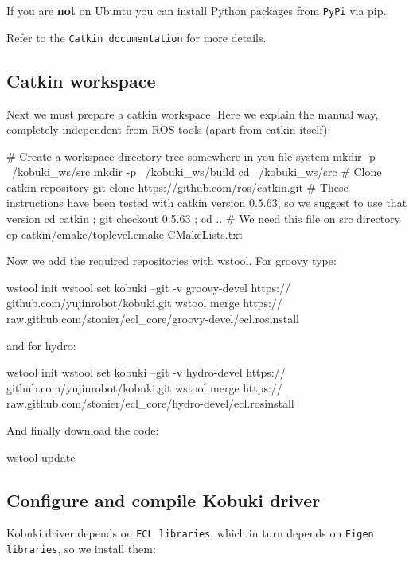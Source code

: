 \-If you are {\bfseries not} on \-Ubuntu you can install \-Python packages from {\tt \-Py\-Pi} via pip.

\-Refer to the {\tt \-Catkin documentation} for more details.\subsection{\-Catkin workspace}\label{enInstallationLinuxGuide_catkin}
\-Next we must prepare a catkin workspace. \-Here we explain the manual way, completely independent from \-R\-O\-S tools (apart from catkin itself)\-:


\begin{DoxyCode}
  # Create a workspace directory tree somewhere in you file system
  mkdir -p ~/kobuki_ws/src
  mkdir -p ~/kobuki_ws/build
  cd ~/kobuki_ws/src
  # Clone catkin repository
  git clone https://github.com/ros/catkin.git
  # These instructions have been tested with catkin version 0.5.63, so we
       suggest to use that version
  cd catkin ; git checkout 0.5.63 ; cd ..
  # We need this file on src directory
  cp catkin/cmake/toplevel.cmake CMakeLists.txt
\end{DoxyCode}


\-Now we add the required repositories with wstool. \-For groovy type\-:


\begin{DoxyCode}
  wstool init
  wstool set kobuki --git -v groovy-devel https://
      github.com/yujinrobot/kobuki.git
  wstool merge https://
      raw.github.com/stonier/ecl_core/groovy-devel/ecl.rosinstall
\end{DoxyCode}


and for hydro\-:


\begin{DoxyCode}
  wstool init
  wstool set kobuki --git -v hydro-devel https://
      github.com/yujinrobot/kobuki.git
  wstool merge https://
      raw.github.com/stonier/ecl_core/hydro-devel/ecl.rosinstall
\end{DoxyCode}


\-And finally download the code\-: 
\begin{DoxyCode}
  wstool update
\end{DoxyCode}
\subsection{\-Configure and compile Kobuki driver}\label{enInstallationLinuxGuide_config}
\-Kobuki driver depends on {\tt \-E\-C\-L libraries}, which in turn depends on {\tt \-Eigen libraries}, so we install them\-:


